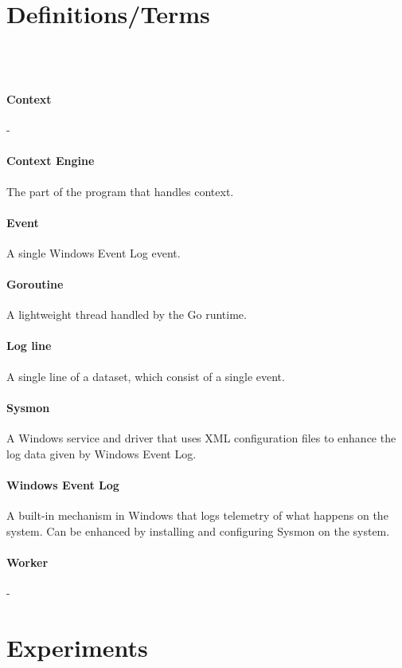 \chapter{Definitions/Terms}
\label{chap:definitions}

\\
\\


\subsubsection{Context} -
\subsubsection{Context Engine} The part of the program that handles context.
\subsubsection{Event} A single Windows Event Log event.
\subsubsection{Goroutine} A lightweight thread handled by the Go runtime.
\subsubsection{Log line} A single line of a dataset, which consist of a single event.
\subsubsection{Sysmon} A Windows service and driver that uses XML configuration files to enhance the log data given by Windows Event Log.
\subsubsection{Windows Event Log} A built-in mechanism in Windows that logs telemetry of what happens on the system. Can be enhanced by installing and configuring Sysmon on the system.
\subsubsection{Worker} -



\chapter{Experiments}
\label{chap:experiments}

